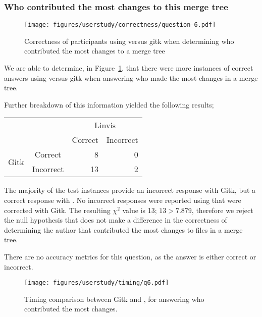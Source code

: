 \subsubsection{Who contributed the most changes to this merge tree}
\label{ssub:who_contributed_the_most_changes_to_this_merge_tree}

\begin{figure}[htpb]
  \centering
  \texttt{[image: figures/userstudy/correctness/question-6.pdf]}
  \caption{Correctness of participants using \tool versus gitk when
    determining who contributed the most changes to a merge tree}
  \label{fig:q_6_correctness}
\end{figure}

We are able to determine, in Figure~\ref{fig:q_6_correctness}, that
there were more instances of correct answers using \tool versus gitk
when answering who made the most changes in a merge tree.

Further breakdown of this information yielded the following results;

\begin{center}
  \begin{tabular}{cc|rr}
                           &           & \multicolumn{2}{c}{Linvis}\\
                           &           & Correct                      & Incorrect\\\hline
    \multirow{2}{*}{Gitk}  & Correct   & 8                            & 0\\
                           & Incorrect & 13                           & 2\\
  \end{tabular}
\end{center}

The majority of the test instances provide an incorrect response with
Gitk, but a correct response with \tool. No incorrect responses were
reported using \tool that were corrected with Gitk. The resulting
$\chi^2$ value is 13; $13 > 7.879$, therefore we reject the null
hypothesis that \tool does not make a difference in the correctness of
determining the author that contributed the most changes to files in a
merge tree.

There are no accuracy metrics for this question, as the answer is either
correct or incorrect.

\begin{figure}[htpb]
  \centering
  \texttt{[image: figures/userstudy/timing/q6.pdf]}
  \caption{Timing comparison between Gitk and \tool, for answering who
    contributed the most changes.}
  \label{fig:q6_timing}
\end{figure}

